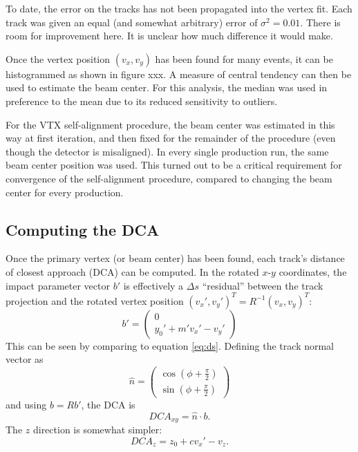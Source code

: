 \documentclass[12pt]{article}
\begin{document}
To date, the error on the tracks has not been propagated into the vertex fit. Each track was given an equal (and somewhat arbitrary) error of $\sigma^2 = 0.01$. There is room for improvement here. It is unclear how much difference it would make.

Once the vertex position $(v_x, v_y)$ has been found for many events, it can be histogrammed as shown in figure xxx. A measure of central tendency can then be used to estimate the beam center. For this analysis, the median was used in preference to the mean due to its reduced sensitivity to outliers.

For the VTX self-alignment procedure, the beam center was estimated in this way at first iteration, and then fixed for the remainder of the procedure (even though the detector is misaligned). In every single production run, the same beam center position was used. This turned out to be a critical requirement for convergence of the self-alignment procedure, compared to changing the beam center for every production. 

\subsection{Computing the DCA}
Once the primary vertex (or beam center) has been found, each track's distance of closest approach (DCA) can be computed. In the rotated $x$-$y$ coordinates, the impact parameter vector $b'$ is effectively a $\Delta s$ ``residual'' between the track projection and the rotated vertex position $(v_x', v_y')^T = R^{-1} (v_x, v_y)^T$:
\begin{equation} \label{eq:ipxy}
b' = 
\begin{pmatrix}
0 \\
y_0' + m' v_x' - v_y'
\end{pmatrix}
\end{equation}
This can be seen by comparing to equation \ref{eq:ds}. Defining the track normal vector as
\begin{equation} \label{eq:nhat}
\hat n = 
\begin{pmatrix}
\cos\left(\phi + \frac{\pi}{2}\right) \\
\sin\left(\phi + \frac{\pi}{2}\right)
\end{pmatrix}
\end{equation}
and using $b = R b'$, the DCA is 
\begin{equation} \label{eq:dcaxy}
DCA_{xy} = \hat n \cdot b.
\end{equation}
The $z$ direction is somewhat simpler:
\begin{equation} \label{eq:dcaz}
DCA_{z} = z_0 + c v_x' - v_z.
\end{equation}
\end{document}
